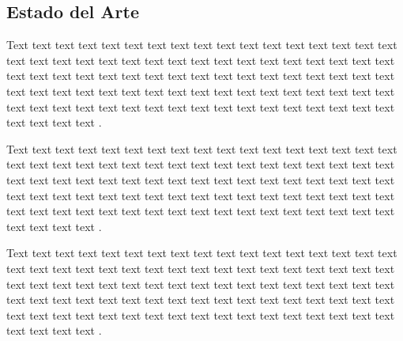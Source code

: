 \documentclass[12pt,a4paper]{article}
\begin{document}
\subsection{Estado del Arte}
\label{sec:7}
Text text text text text text text text text text text text text text text text text text text text text text text text text text text text text text text text text text text text text text text text text text text text text text text text text text text text text text text text text text text text text text text text text text text text text text text text text text text text text text text text text text text text text text text text text \cite{Inga2021}.

Text text text text text text text text text text text text text text text text text text text text text text text text text text text text text text text text text text text text text text text text text text text text text text text text text text text text text text text text text text text text text text text text text text text text text text text text text text text text text text text text text text text text text text text text text \cite{Inga2019}.

Text text text text text text text text text text text text text text text text text text text text text text text text text text text text text text text text text text text text text text text text text text text text text text text text text text text text text text text text text text text text text text text text text text text text text text text text text text text text text text text text text text text text text text text text text \cite{Inga2017}.
\end{document}
